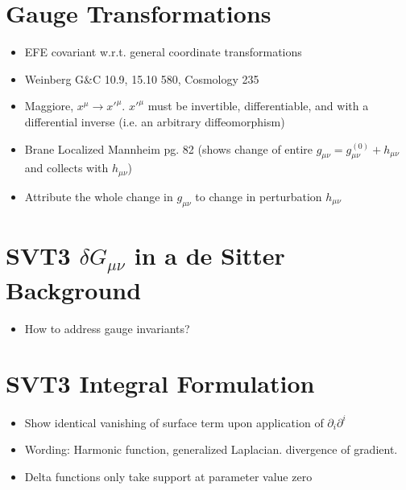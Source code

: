 \documentclass[10pt,letterpaper]{article}
\numberwithin{equation}{section}
\begin{document}
\section*{Gauge Transformations}
\begin{itemize}	
	\item EFE covariant w.r.t. general coordinate transformations
	\item Weinberg G\&C 10.9, 15.10 580, Cosmology 235
	\item Maggiore, $x^\mu \to x'^\mu$. $x'^\mu$ must be invertible, differentiable, and with a differential inverse (i.e. an arbitrary diffeomorphism)
	\item Brane Localized Mannheim pg. 82 (shows change of entire $g_{\mu\nu} = g_{\mu\nu}^{(0)}+h_{\mu\nu}$ and collects with $h_{\mu\nu}$)
	\item Attribute the whole change in $g_{\mu\nu}$ to change in perturbation $h_{\mu\nu}$
\end{itemize}

\section*{SVT3 $\delta G_{\mu\nu}$ in a de Sitter Background}
\begin{itemize}
	\item How to address gauge invariants?
\end{itemize}

\section*{SVT3 Integral Formulation}
\begin{itemize}
	\item Show identical vanishing of surface term upon application of $\partial_i \partial^i$
	\item Wording: Harmonic function, generalized  Laplacian. divergence of gradient. 
	\item Delta functions only take support at parameter value zero
\end{itemize}
\end{document}
